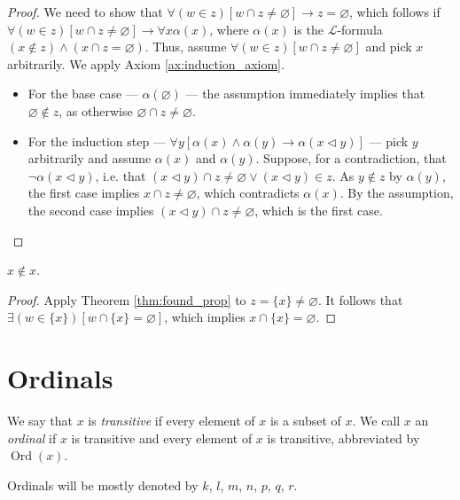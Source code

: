 \begin{proof}
    \leanok
    We need to show that $\forall (w \in z)[w \cap z \neq \varnothing] \rightarrow z = \varnothing$, 
    which follows if $\forall (w \in z)[w \cap z \neq \varnothing] \rightarrow \forall x \alpha(x)$, 
    where $\alpha(x)$ is the $\mathcal{L}$-formula $(x \notin z) \land (x \cap z = \varnothing)$.
    Thus, assume $\forall (w \in z)[w \cap z \neq \varnothing]$ and pick $x$ arbitrarily.
    We apply Axiom \ref{ax:induction_axiom}.
    \begin{itemize}
        \item For the base case — $\alpha (\varnothing)$ — the assumption immediately implies that 
        $\varnothing \notin z$, as otherwise $\varnothing \cap z \neq \varnothing$.
        \item For the induction step 
        — $\forall y[\alpha(x) \land \alpha(y) \rightarrow \alpha(x \lhd y)]$ — 
        pick $y$ arbitrarily and assume $\alpha(x)$ and $\alpha(y)$.
        Suppose, for a contradiction, that $\neg \alpha (x \lhd y)$, i.e. 
        that $(x \lhd y) \cap z \neq \varnothing \lor (x \lhd y) \in z$. 
        As $y \notin z$ by $\alpha(y)$, the first case implies $x \cap z \neq \varnothing$, 
        which contradicts $\alpha(x)$. 
        By the assumption, the second case implies $(x \lhd y) \cap z \neq \varnothing$, 
        which is the first case.
    \end{itemize}
\end{proof}

\begin{corollary}
    \label{cor:mem_irrefl}
    \leanok
    $x \notin x$.
\end{corollary}

\begin{proof}
    \leanok
    Apply Theorem \ref{thm:found_prop} to $z = \{x\}\neq \varnothing$.
    It follows that $\exists (w \in \{x\})[w\cap \{x\} = \varnothing]$, 
    which implies $x \cap \{x\} = \varnothing$.
\end{proof}

\section{Ordinals}

\begin{definition}
    \label{def:IsTrans+IsOrd}
    \leanok
    We say that $x$ is \textit{transitive} if every element of $x$ is a subset of $x$. 
    We call $x$ an \textit{ordinal} if $x$ is transitive and every element of $x$ is transitive, 
    abbreviated by $\operatorname{Ord}(x)$.

    Ordinals will be mostly denoted by $k$, $l$, $m$, $n$, $p$, $q$, $r$.
\end{definition}

